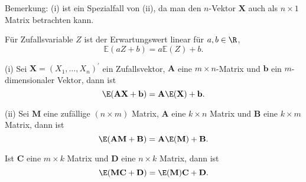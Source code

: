 \documentclass{tstextbook}
\begin{document}
\begin{remark}
	Bemerkung: (i) ist ein Spezialfall von (ii), da man den $n$-Vektor
$\textbf{X}$ auch als $n\times1$ Matrix betrachten kann.
\end{remark}

Für Zufallsvariable $Z$ ist der Erwartungswert linear für $a,b\in\R$,
\[
\mathbb{E}(aZ+b)=a\mathbb{E}(Z)+b.
\]

\begin{theorem}
	\label{th:linearitäterwartungswert}
(i) Sei $\textbf{X}=(X_{1},\ldots,X_{n})^{\prime}$ ein Zufallsvektor, $\textbf{A}$
eine $m\times n$-Matrix und $\textbf{b}$ ein $m$-dimensionaler Vektor, dann
ist 
\[
\E(\textbf{A}\textbf{X}+\textbf{b})=\textbf{A}\E(\textbf{X})+\textbf{b}.
\]

(ii) Sei $\textbf{M}$ eine zufällige $(n\times m)$ Matrix,
$\textbf{A}$ eine $k\times n$ Matrix und $\textbf{B}$ eine $k\times m$ Matrix, dann
ist 
\[
\E(\textbf{A}\textbf{M}+\textbf{B})=\textbf{A}\E(\textbf{M})+\textbf{B}.
\]

Ist $\textbf{C}$ eine $m\times k$ Matrix und $\textbf{D}$ eine $n\times k$ Matrix,
dann ist 
\[
\E(\textbf{M}\textbf{C}+\textbf{D})=\E(\textbf{M})\textbf{C}+\textbf{D}.
\]

\end{theorem}
\end{document}
